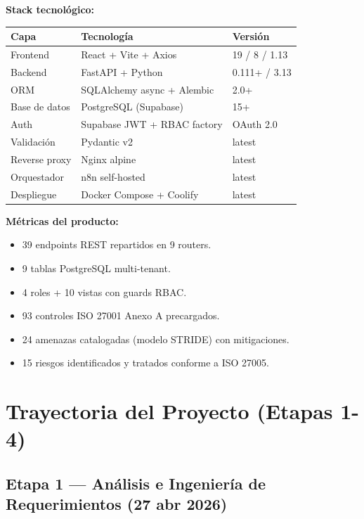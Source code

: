 \documentclass[12pt,a4paper,oneside]{article}
\begin{document}
\textbf{Stack tecnológico:}

\begin{table}[h]
\centering
\small
\begin{tabularx}{\textwidth}{lXl}
\toprule
\textbf{Capa} & \textbf{Tecnología} & \textbf{Versión} \\
\midrule
Frontend & React + Vite + Axios & 19 / 8 / 1.13 \\
Backend & FastAPI + Python & 0.111+ / 3.13 \\
ORM & SQLAlchemy async + Alembic & 2.0+ \\
Base de datos & PostgreSQL (Supabase) & 15+ \\
Auth & Supabase JWT + RBAC factory & OAuth 2.0 \\
Validación & Pydantic v2 & latest \\
Reverse proxy & Nginx alpine & latest \\
Orquestador & n8n self-hosted & latest \\
Despliegue & Docker Compose + Coolify & latest \\
\bottomrule
\end{tabularx}
\end{table}

\textbf{Métricas del producto:}

\begin{itemize}[leftmargin=*]
  \item 39 endpoints REST repartidos en 9 routers.
  \item 9 tablas PostgreSQL multi-tenant.
  \item 4 roles + 10 vistas con guards RBAC.
  \item 93 controles ISO 27001 Anexo A precargados.
  \item 24 amenazas catalogadas (modelo STRIDE) con mitigaciones.
  \item 15 riesgos identificados y tratados conforme a ISO 27005.
\end{itemize}

\section{Trayectoria del Proyecto (Etapas 1-4)}

\subsection{Etapa 1 — Análisis e Ingeniería de Requerimientos (27 abr 2026)}
\end{document}
